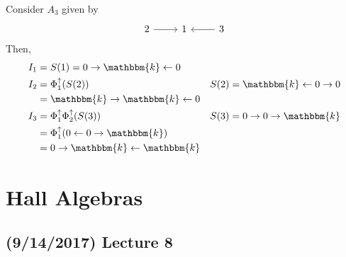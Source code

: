 \documentclass[11pt,leqno,oneside]{amsbook}
\numberwithin{thm}{section}
\newcommand{\bbk}{\mathbbm{k}} %
\newcommand{\sourcetosinkfunc}{\Phi^\uparrow} %
\begin{document}
\begin{example}
  Consider \(A_3\) given by \[
    \begin{tikzcd}
      2 \rar & 1 & \lar 3
    \end{tikzcd}
  \]
  Then,
  \begin{align*}
    I_1 & = S(1) = 0 \rightarrow \bbk \leftarrow 0 \\
    I_2 & = \sourcetosinkfunc_1 (S(2)) & S(2) = \bbk \leftarrow 0
                                         \rightarrow 0 \\
        & = \bbk \rightarrow \bbk \leftarrow 0 \\
    I_3 & = \sourcetosinkfunc_1 \sourcetosinkfunc_2(S(3))
        & S(3) = 0 \rightarrow 0 \rightarrow \bbk \\
        & = \sourcetosinkfunc_1 ( 0 \leftarrow 0 \rightarrow \bbk) \\
        & = 0 \rightarrow \bbk \leftarrow \bbk
  \end{align*}
\end{example}
\section{Hall Algebras}
\subsection*{(9/14/2017) Lecture 8}
\end{document}
